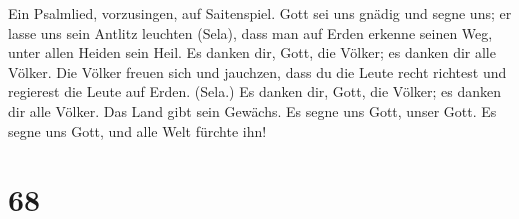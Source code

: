  Ein Psalmlied, vorzusingen, auf Saitenspiel.
 Gott sei uns gnädig und segne uns; er lasse uns sein
Antlitz leuchten (Sela),  dass man auf Erden erkenne
seinen Weg, unter allen Heiden sein Heil.  Es danken dir,
Gott, die Völker; es danken dir alle Völker.  Die Völker
freuen sich und jauchzen, dass du die Leute recht richtest und regierest
die Leute auf Erden. (Sela.)  Es danken dir, Gott, die
Völker; es danken dir alle Völker.  Das Land gibt sein
Gewächs. Es segne uns Gott, unser Gott.  Es segne uns
Gott, und alle Welt fürchte ihn!

\hypertarget{section-67}{%
\section{68}\label{section-67}}

